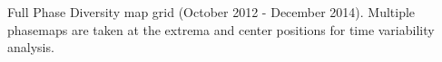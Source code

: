 Full Phase Diversity map grid (October 2012 - December 2014). Multiple phasemaps are taken at the extrema and center positions for time variability analysis.
    